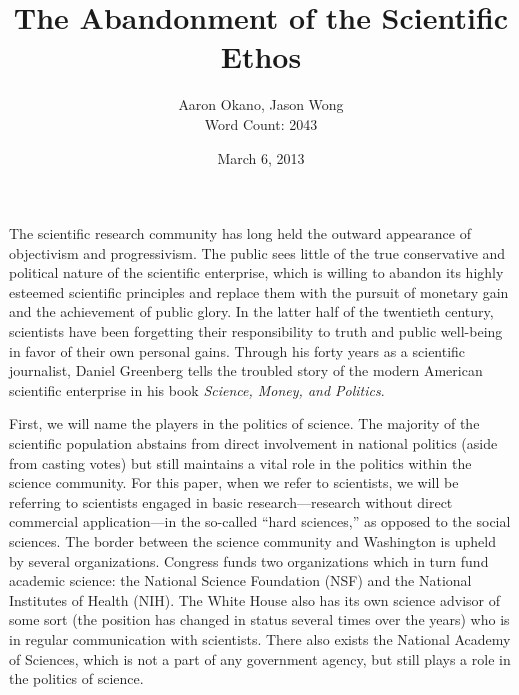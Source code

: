 \documentclass{article}[12pt]
\title{The Abandonment of the Scientific Ethos}  %
\author{Aaron Okano, Jason Wong\\Word Count: 2043 }    %
\date{March 6, 2013}   %
\begin{document}

\maketitle                 %

The scientific research community has long held the outward appearance of
objectivism and progressivism. The public sees little of the true conservative
and political nature of the scientific enterprise, which is willing to abandon
its highly esteemed scientific principles and replace them with the pursuit
of monetary gain and the achievement of public glory. In the latter half of the
twentieth century, scientists have been forgetting their responsibility to
truth and public well-being in favor of their own personal gains. Through his
forty years as a scientific journalist, Daniel Greenberg tells the troubled
story of the modern American scientific enterprise in his book \emph{Science,
Money, and Politics}.

First, we will name the players in the politics of science. The majority of the
scientific population abstains from direct involvement in national politics
(aside from casting votes) but still maintains a vital role in the politics
within the science community. For this paper, when we refer to scientists, we
will be referring to scientists engaged in basic research---research without
direct commercial application---in the so-called ``hard sciences,'' as opposed
to the social sciences. The border between the science community and Washington
is upheld by several organizations. Congress funds two organizations which in
turn fund academic science: the National Science Foundation (NSF) and the
National Institutes of Health (NIH). The White House also has its own science
advisor of some sort (the position has changed in status several times over the
years) who is in regular communication with scientists. There also exists the
National Academy of Sciences, which is not a part of any government agency, but
still plays a role in the politics of science.
\end{document}
